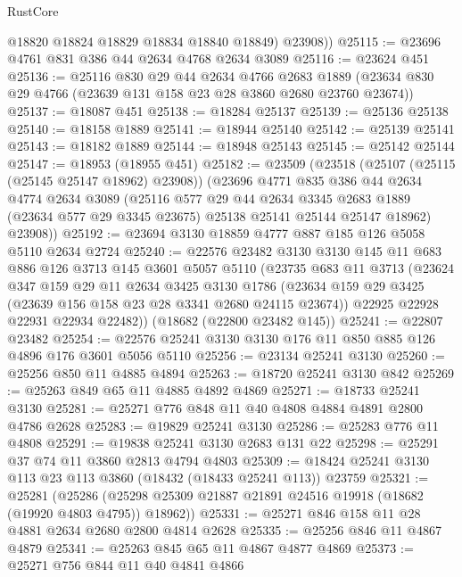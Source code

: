 \begin{lexlean}{RustCore}
\begin{coremodule}
          @18820
          @18824
          @18829
          @18834
          @18840
          @18849)
        @23908))
@25115 := @23696 @4761 @831 @386 @44 @2634 @4768 @2634 @3089
@25116 := @23624 @451
@25136 := @25116
    @830
    @29
    @44
    @2634
    @4766
    @2683
    @1889
    (@23634 @830 @29 @4766 (@23639 @131 @158 @23 @28 @3860 @2680 @23760 @23674))
@25137 := @18087 @451
@25138 := @18284 @25137
@25139 := @25136 @25138
@25140 := @18158 @1889
@25141 := @18944 @25140
@25142 := @25139 @25141
@25143 := @18182 @1889
@25144 := @18948 @25143
@25145 := @25142 @25144
@25147 := @18953 (@18955 @451)
@25182 := @23509
    (@23518
      (@25107 (@25115 (@25145 @25147 @18962) @23908))
      (@23696
        @4771
        @835
        @386
        @44
        @2634
        @4774
        @2634
        @3089
        (@25116
          @577
          @29
          @44
          @2634
          @3345
          @2683
          @1889
          (@23634 @577 @29 @3345 @23675)
          @25138
          @25141
          @25144
          @25147
          @18962)
        @23908))
@25192 := @23694 @3130 @18859 @4777 @887 @185 @126 @5058 @5110 @2634 @2724
@25240 := @22576
    @23482
    @3130
    @3130
    @145
    @11
    @683
    @886
    @126
    @3713
    @145
    @3601
    @5057
    @5110
    (@23735
      @683
      @11
      @3713
      (@23624
        @347
        @159
        @29
        @11
        @2634
        @3425
        @3130
        @1786
        (@23634 @159 @29 @3425 (@23639 @156 @158 @23 @28 @3341 @2680 @24115 @23674))
        @22925
        @22928
        @22931
        @22934
        @22482))
    (@18682 (@22800 @23482 @145))
@25241 := @22807 @23482
@25254 := @22576 @25241 @3130 @3130 @176 @11 @850 @885 @126 @4896 @176 @3601 @5056 @5110
@25256 := @23134 @25241 @3130
@25260 := @25256 @850 @11 @4885 @4894
@25263 := @18720 @25241 @3130 @842
@25269 := @25263 @849 @65 @11 @4885 @4892 @4869
@25271 := @18733 @25241 @3130
@25281 := @25271 @776 @848 @11 @40 @4808 @4884 @4891 @2800 @4786 @2628
@25283 := @19829 @25241 @3130
@25286 := @25283 @776 @11 @4808
@25291 := @19838 @25241 @3130 @2683 @131 @22
@25298 := @25291 @37 @74 @11 @3860 @2813 @4794 @4803
@25309 := @18424 @25241 @3130 @113 @23 @113 @3860 (@18432 (@18433 @25241 @113)) @23759
@25321 := @25281
    (@25286 (@25298 @25309 @21887 @21891 @24516 @19918 (@18682 (@19920 @4803 @4795)) @18962))
@25331 := @25271 @846 @158 @11 @28 @4881 @2634 @2680 @2800 @4814 @2628
@25335 := @25256 @846 @11 @4867 @4879
@25341 := @25263 @845 @65 @11 @4867 @4877 @4869
@25373 := @25271
    @756
    @844
    @11
    @40
    @4841
    @4866

\end{coremodule}
\end{lexlean}
